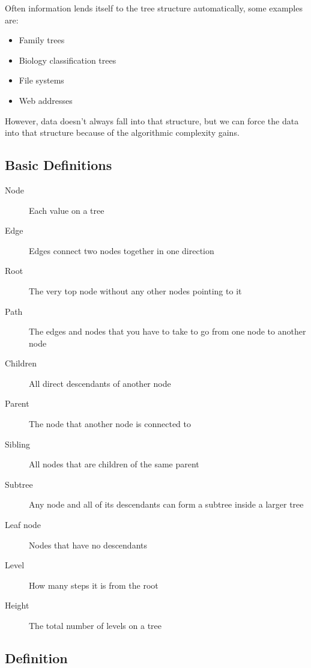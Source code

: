 Often information lends itself to the tree structure automatically, some examples are:
\begin{itemize}
    \item Family trees
    \item Biology classification trees
    \item File systems
    \item Web addresses
\end{itemize}
However, data doesn't always fall into that structure, but we can force the data into that structure because of the algorithmic complexity gains.

\subsection{Basic Definitions}\label{sub:basic_definitions}

\begin{description}
    \item[Node] Each value on a tree
    \item[Edge] Edges connect two nodes together in one direction
    \item[Root] The very top node without any other nodes pointing to it
    \item[Path] The edges and nodes that you have to take to go from one node to another node
    \item[Children] All direct descendants of another node
    \item[Parent] The node that another node is connected to
    \item[Sibling] All nodes that are children of the same parent
    \item[Subtree] Any node and all of its descendants can form a subtree inside a larger tree
    \item[Leaf node] Nodes that have no descendants
    \item[Level] How many steps it is from the root
    \item[Height] The total number of levels on a tree
\end{description}

\subsection{Definition}\label{sub:definitiontree}

